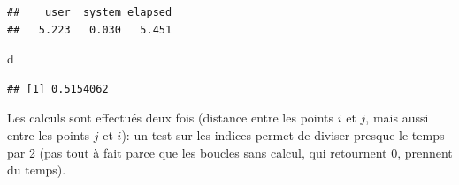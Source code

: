 \documentclass[
  12pt,
  french,
  a4paper,
  extrafontsizes,onecolumn,openright
  ]{memoir}
\newenvironment{Shaded}{\begin{snugshade}}{\end{snugshade}}
\newcommand{\ControlFlowTok}[1]{\textcolor[rgb]{0.13,0.29,0.53}{\textbf{#1}}}
\newcommand{\DecValTok}[1]{\textcolor[rgb]{0.00,0.00,0.81}{#1}}
\newcommand{\KeywordTok}[1]{\textcolor[rgb]{0.13,0.29,0.53}{\textbf{#1}}}
\newcommand{\NormalTok}[1]{#1}
\newcommand{\OperatorTok}[1]{\textcolor[rgb]{0.81,0.36,0.00}{\textbf{#1}}}
\newcommand{\StringTok}[1]{\textcolor[rgb]{0.31,0.60,0.02}{#1}}
\begin{document}
\begin{verbatim}
##    user  system elapsed 
##   5.223   0.030   5.451
\end{verbatim}

\begin{Shaded}
\begin{Highlighting}[]
\NormalTok{d}
\end{Highlighting}
\end{Shaded}

\begin{verbatim}
## [1] 0.5154062
\end{verbatim}

\normalsize

Les calculs sont effectués deux fois (distance entre les points \(i\) et \(j\), mais aussi entre les points \(j\) et \(i\)): un test sur les indices permet de diviser presque le temps par 2 (pas tout à fait parce que les boucles sans calcul, qui retournent \(0\), prennent du temps).

\scriptsize

\begin{Shaded}
\end{Shaded}
\end{document}
